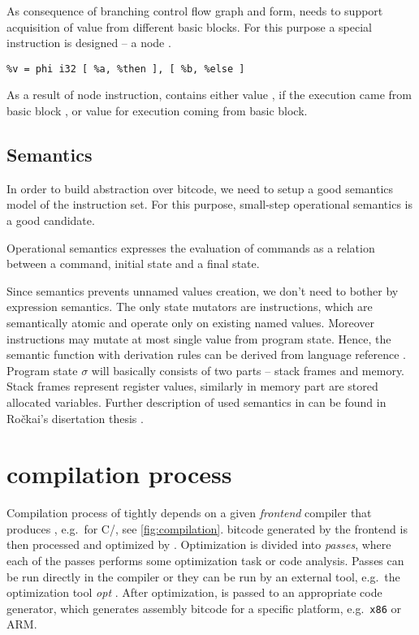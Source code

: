 As consequence of branching control flow graph and \SSA form, \LLVM needs to
support acquisition of value from different basic blocks. For this
purpose a special instruction is designed -- a  node \cite{Cytron91}.

\begin{verbatim}
%v = phi i32 [ %a, %then ], [ %b, %else ]
\end{verbatim}

As a result of  node instruction,  contains either value ,
if the execution came from basic block , or value  for execution
coming from  basic block.

\subsection{Semantics} \label{subsec:semantics}

In order to build abstraction over \LLVM bitcode, we need to setup a good
semantics model of the instruction set. For this purpose, small-step operational
semantics \cite{Plotkin04} is a good candidate.

\begin{definition}
Operational semantics expresses the evaluation of commands as a relation between
a command, initial state and a final state.
\end{definition}

\noindent
Since \LLVMIR semantics prevents unnamed values creation, we don't need to
bother by expression semantics. The only state mutators are instructions, which are
semantically atomic and operate only on existing named values. Moreover
instructions may mutate at most single value from program state. Hence, the
semantic function with derivation rules can be derived from \LLVM
language reference \cite{LLVM:langref}. Program state $\sigma$ will basically
consists of two parts -- stack frames and memory. Stack frames represent
register values, similarly in memory part are stored allocated variables.
Further description of used \LLVM semantics in \DIVINE can be found in Ročkai's
disertation thesis \cite{Rockai15}.

\section{\LLVM compilation process} \label{sec:compilation}

Compilation process of \LLVM tightly depends on a given \emph{frontend} compiler that produces
\LLVMIR, e.g.~\clang for C/\Cpp{}, see \autoref{fig:compilation}.
\LLVM bitcode generated by the frontend is then processed and optimized by \LLVM.
Optimization is divided into \LLVM \emph{passes}, where each of the passes
performs some optimization task or code analysis. Passes can be run directly
in the compiler or they can be run by an external tool, e.g.~the \LLVM
optimization tool \emph{opt} \cite{LLVM:opt}. After optimization, \LLVMIR is passed to
an appropriate code generator, which generates assembly bitcode for a specific
platform, e.g.~\texttt{x86} or ARM.

